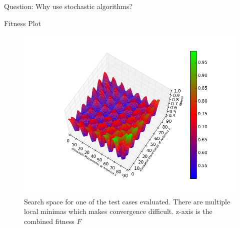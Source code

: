 \documentclass{beamer}
\begin{document}
\begin{frame}{\null}
    \begin{tcolorbox}[colback=green!5]
        \centering
        Question: Why use stochastic algorithms?
    \end{tcolorbox}
\end{frame}

\begin{frame}[t]{Fitness Plot}
    \begin{figure}
        \vspace*{-0.35cm}
        \centering
        \includegraphics[scale=0.4]{../paper/FIG/tc1_ss}
        \caption*{Search space for one of the test cases evaluated. There are multiple local minimas which makes convergence difficult. z-axis is the combined fitness $F$}
    \end{figure}
\end{frame}
\end{document}
